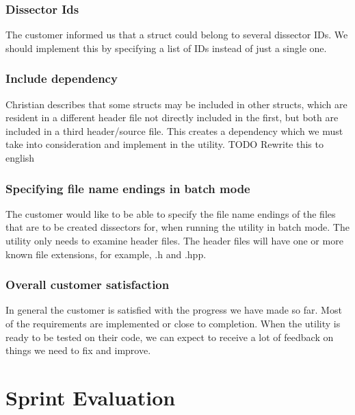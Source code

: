 \subsubsection{Dissector Ids}

The customer informed us that a struct could belong to several dissector IDs.
We should implement this by specifying a list of IDs instead of just a single one.

\subsubsection{Include dependency}

Christian describes that some structs may be included in other structs, which are resident in a different header file
not directly included in the  first, but both are included in a third header/source file. This creates a dependency which we must take
into consideration and implement in the utility.
TODO Rewrite this to english

\subsubsection{Specifying file name endings in batch mode}

The customer would like to be able to specify the file name endings of the files that are to be created dissectors for,
when running the utility in batch mode. The utility only needs to examine header files. The header files will have one or more known
file extensions, for example, .h and .hpp.

\subsubsection{Overall customer satisfaction}

In general the customer is satisfied with the progress we have made so far. Most of the requirements are
implemented or close to completion. When the utility is ready to be tested on their code, we can expect to receive
a lot of feedback on things we need to fix and improve.


















\section{Sprint Evaluation}


